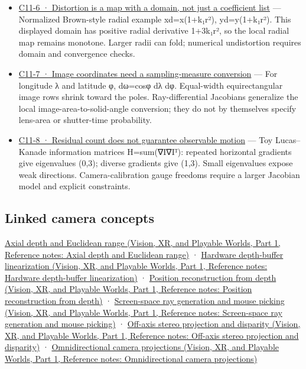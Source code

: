 \begin{itemize}
\item
  \hyperref[02-foundations-ii-ch035-figure-c11-6-distortion-is-a-map-with-a-domain-not-just-a-coefficient-list]{C11-6 · Distortion is a map with a domain, not just a coefficient list} --- Normalized Brown-style radial example xd=x(1+k₁r²), yd=y(1+k₁r²). This displayed domain has positive radial derivative 1+3k₁r², so the local radial map remains monotone. Larger radii can fold; numerical undistortion requires domain and convergence checks.
\item
  \hyperref[02-foundations-ii-ch035-figure-c11-7-image-coordinates-need-a-sampling-measure-conversion]{C11-7 · Image coordinates need a sampling-measure conversion} --- For longitude λ and latitude φ, dω=cosφ dλ dφ. Equal-width equirectangular image rows shrink toward the poles. Ray-differential Jacobians generalize the local image-area-to-solid-angle conversion; they do not by themselves specify lens-area or shutter-time probability.
\item
  \hyperref[02-foundations-ii-ch035-figure-c11-8-residual-count-does-not-guarantee-observable-motion]{C11-8 · Residual count does not guarantee observable motion} --- Toy Lucas--Kanade information matrices H=sum(∇I∇Iᵀ): repeated horizontal gradients give eigenvalues (0,3); diverse gradients give (1,3). Small eigenvalues expose weak directions. Camera-calibration gauge freedoms require a larger Jacobian model and explicit constraints.
\end{itemize}

\subsection{Linked camera concepts}\label{appendix-a2b71a18f5a2-linked-camera-concepts}

\hypertarget{appendix-a2b71a18f5a2-linked-camera-concepts}{}

\href{../07-Vision-XR-and-Playable-Worlds-P01/main.pdf\#nameddest=appendix-cac01ebeeb11}{Axial depth and Euclidean range (Vision, XR, and Playable Worlds, Part 1, Reference notes: Axial depth and Euclidean range)} · \href{../07-Vision-XR-and-Playable-Worlds-P01/main.pdf\#nameddest=appendix-1bc40b08db4a}{Hardware depth-buffer linearization (Vision, XR, and Playable Worlds, Part 1, Reference notes: Hardware depth-buffer linearization)} · \href{../07-Vision-XR-and-Playable-Worlds-P01/main.pdf\#nameddest=appendix-2cbf2968e866}{Position reconstruction from depth (Vision, XR, and Playable Worlds, Part 1, Reference notes: Position reconstruction from depth)} · \href{../07-Vision-XR-and-Playable-Worlds-P01/main.pdf\#nameddest=appendix-f1a6d43e80d1}{Screen-space ray generation and mouse picking (Vision, XR, and Playable Worlds, Part 1, Reference notes: Screen-space ray generation and mouse picking)} · \href{../07-Vision-XR-and-Playable-Worlds-P01/main.pdf\#nameddest=appendix-0976e86e5b9f}{Off-axis stereo projection and disparity (Vision, XR, and Playable Worlds, Part 1, Reference notes: Off-axis stereo projection and disparity)} · \href{../07-Vision-XR-and-Playable-Worlds-P01/main.pdf\#nameddest=appendix-fc99ad39f351}{Omnidirectional camera projections (Vision, XR, and Playable Worlds, Part 1, Reference notes: Omnidirectional camera projections)}

